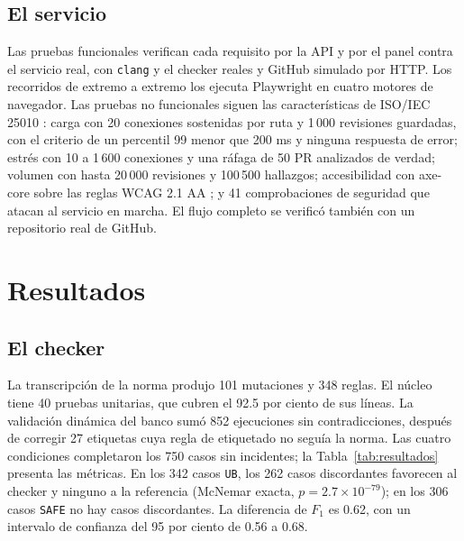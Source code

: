\documentclass[conference]{IEEEtran}
\newcommand{\code}[1]{\texttt{#1}}
\begin{document}
\subsection{El servicio}
Las pruebas funcionales verifican cada requisito por la API y por el panel contra el servicio real, con \code{clang} y el checker reales y GitHub simulado por HTTP. Los recorridos de extremo a extremo los ejecuta Playwright en cuatro motores de navegador. Las pruebas no funcionales siguen las características de ISO/IEC 25010 \cite{iso25010}: carga con 20 conexiones sostenidas por ruta y 1\,000 revisiones guardadas, con el criterio de un percentil 99 menor que 200 ms y ninguna respuesta de error; estrés con 10 a 1\,600 conexiones y una ráfaga de 50 PR analizados de verdad; volumen con hasta 20\,000 revisiones y 100\,500 hallazgos; accesibilidad con axe-core sobre las reglas WCAG 2.1 AA \cite{wcag21}; y 41 comprobaciones de seguridad que atacan al servicio en marcha. El flujo completo se verificó también con un repositorio real de GitHub.

\section{Resultados}

\subsection{El checker}
La transcripción de la norma produjo 101 mutaciones y 348 reglas. El núcleo tiene 40 pruebas unitarias, que cubren el 92.5 por ciento de sus líneas. La validación dinámica del banco sumó 852 ejecuciones sin contradicciones, después de corregir 27 etiquetas cuya regla de etiquetado no seguía la norma. Las cuatro condiciones completaron los 750 casos sin incidentes; la Tabla~\ref{tab:resultados} presenta las métricas. En los 342 casos \code{UB}, los 262 casos discordantes favorecen al checker y ninguno a la referencia (McNemar exacta, $p = 2.7\times 10^{-79}$); en los 306 casos \code{SAFE} no hay casos discordantes. La diferencia de $F_1$ es 0.62, con un intervalo de confianza del 95 por ciento de 0.56 a 0.68.
\end{document}
